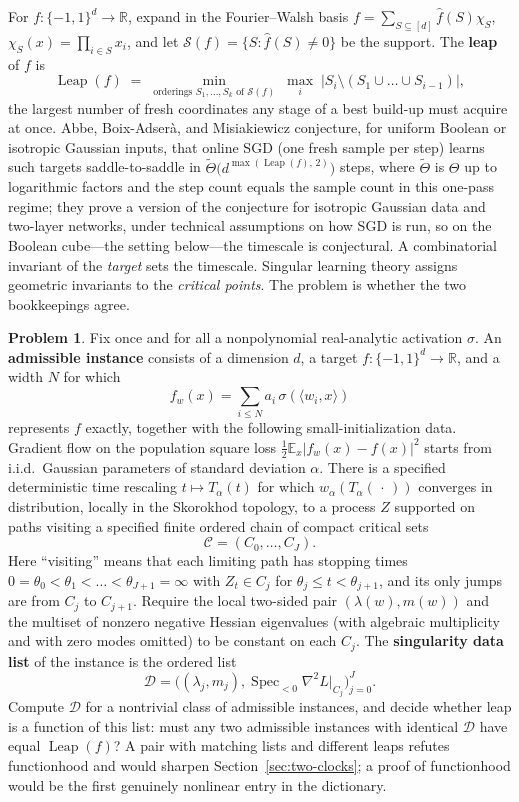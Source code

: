 \documentclass[11pt]{amsart}
\theoremstyle{plain}
\theoremstyle{definition}
\newtheorem{problem}[theorem]{Problem}
\newcommand{\R}{\mathbb{R}}
\newcommand{\E}{\mathbb{E}}
\begin{document}
For $f\colon \{-1, 1\}^d \to \R$, expand in the Fourier--Walsh basis $f = \sum_{S \subseteq [d]} \hat f(S) \chi_S$, $\chi_S(x) = \prod_{i \in S} x_i$, and let $\mathcal{S}(f) = \{ S : \hat f(S) \neq 0 \}$ be the support. The \textbf{leap} of $f$ is
\[
   \operatorname{Leap}(f) \;=\; \min_{\text{orderings } S_1, \dots, S_k \text{ of } \mathcal S(f)} \; \max_{i} \; \bigl| S_i \setminus (S_1 \cup \dots \cup S_{i-1}) \bigr| ,
\]
the largest number of fresh coordinates any stage of a best build-up must acquire at once. Abbe, Boix-Adser\`a, and Misiakiewicz \cite{abbe2023} conjecture, for uniform Boolean or isotropic Gaussian inputs, that online SGD (one fresh sample per step) learns such targets saddle-to-saddle in $\tilde\Theta\bigl(d^{\max(\operatorname{Leap}(f),\,2)}\bigr)$ steps, where $\tilde\Theta$ is $\Theta$ up to logarithmic factors and the step count equals the sample count in this one-pass regime; they prove a version of the conjecture for isotropic Gaussian data and two-layer networks, under technical assumptions on how SGD is run, so on the Boolean cube---the setting below---the timescale is conjectural. A combinatorial invariant of the \emph{target} sets the timescale. Singular learning theory assigns geometric invariants to the \emph{critical points}. The problem is whether the two bookkeepings agree.

\begin{problem}\label{prob:leap}
Fix once and for all a nonpolynomial real-analytic activation $\sigma$. An \textbf{admissible instance} consists of a dimension $d$, a target $f\colon\{-1,1\}^d\to\R$, and a width $N$ for which
\[
   f_w(x)=\sum_{i\le N}a_i\,\sigma(\langle w_i,x\rangle)
\]
represents $f$ exactly, together with the following small-initialization data. Gradient flow on the population square loss $\tfrac12\E_x|f_w(x)-f(x)|^2$ starts from i.i.d.\ Gaussian parameters of standard deviation $\alpha$. There is a specified deterministic time rescaling $t\mapsto T_\alpha(t)$ for which $w_\alpha(T_\alpha(\,\cdot\,))$ converges in distribution, locally in the Skorokhod topology, to a process $Z$ supported on paths visiting a specified finite ordered chain of compact critical sets
\[
   \mathcal C=(C_0,\dots,C_J).
\]
Here ``visiting'' means that each limiting path has stopping times $0=\theta_0<\theta_1<\dots<\theta_{J+1}=\infty$ with $Z_t\in C_j$ for $\theta_j\le t<\theta_{j+1}$, and its only jumps are from $C_j$ to $C_{j+1}$.
Require the local two-sided pair $(\lambda(w),m(w))$ and the multiset of nonzero negative Hessian eigenvalues (with algebraic multiplicity and with zero modes omitted) to be constant on each $C_j$. The \textbf{singularity data list} of the instance is the ordered list
\[
   \mathcal D
   =
   \bigl((\lambda_j,m_j),\operatorname{Spec}_{<0}\nabla^2L|_{C_j}\bigr)_{j=0}^{J}.
\]
Compute $\mathcal D$ for a nontrivial class of admissible instances, and decide whether leap is a function of this list: must any two admissible instances with identical $\mathcal D$ have equal $\operatorname{Leap}(f)$? A pair with matching lists and different leaps refutes functionhood and would sharpen Section~\ref{sec:two-clocks}; a proof of functionhood would be the first genuinely nonlinear entry in the dictionary.
\end{problem}
\end{document}
